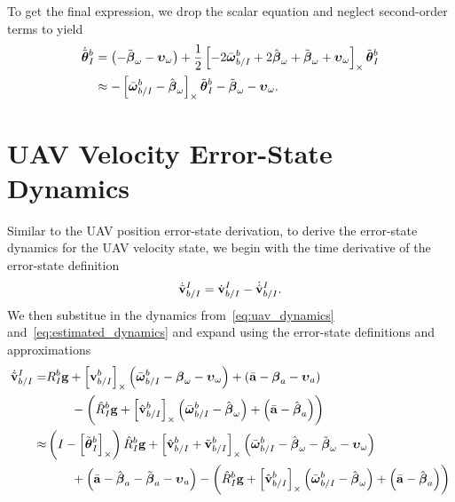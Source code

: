 To get the final expression, we drop the scalar equation and neglect
second-order terms to yield
\begin{align}
  \dot{\tilde{\boldsymbol{\mathrm{\theta}}}}_I^b
  &=
    \left( - \tilde{\boldsymbol{\mathrm{\beta}}}_\omega -
    \boldsymbol{\mathrm{\upsilon}}_\omega \right) 
    + \frac{1}{2}
    \left[  -2\bar{\boldsymbol{\mathrm{\omega}}}_{b/I}^b + 2\hat{\boldsymbol{\mathrm{\beta}}}_\omega
      + \tilde{\boldsymbol{\mathrm{\beta}}}_\omega + \boldsymbol{\mathrm{\upsilon}}_\omega  \right]_{\times}
    \tilde{\boldsymbol{\mathrm{\theta}}}_I^b \\
  &\approx
  -\left[  \bar{\boldsymbol{\mathrm{\omega}}}_{b/I}^b - \hat{\boldsymbol{\mathrm{\beta}}}_\omega \right]_{\times}
    \tilde{\boldsymbol{\mathrm{\theta}}}_I^b
    - \tilde{\boldsymbol{\mathrm{\beta}}}_\omega -
    \boldsymbol{\mathrm{\upsilon}}_\omega .
\end{align}

\section{UAV Velocity Error-State Dynamics}
Similar to the UAV position error-state derivation, to derive the error-state
dynamics for the UAV velocity state, we begin with the time derivative of the
error-state definition
\begin{equation}
  \dot{\tilde{\boldsymbol{\mathrm{v}}}}_{b/I}^I = \dot{\boldsymbol{\mathrm{v}}}_{b/I}^I -
  \dot{\hat{\boldsymbol{\mathrm{v}}}}_{b/I}^I.
\end{equation}
We then substitue in the dynamics from~\eqref{eq:uav_dynamics}
and~\eqref{eq:estimated_dynamics} and expand using the error-state definitions
and approximations
\begin{align}
  \dot{\tilde{\boldsymbol{\mathrm{v}}}}_{b/I}^I
  =&
  R_I^b \boldsymbol{\mathrm{g}}
  +
  \left[ \boldsymbol{\mathrm{v}}_{b/I}^b \right]_{\times}
  \left( \bar{\boldsymbol{\mathrm{\omega}}}_{b/I}^b - \boldsymbol{\mathrm{\beta}}_\omega -
  \boldsymbol{\mathrm{\upsilon}}_\omega \right)
  +
  \left( \bar{\boldsymbol{\mathrm{a}}} - \boldsymbol{\mathrm{\beta}}_a - \boldsymbol{\mathrm{\upsilon}}_a \right) \\
                                  & \qquad -
                                  \left( \hat{R}_I^b \boldsymbol{\mathrm{g}}
  +
  \left[ \hat{\boldsymbol{\mathrm{v}}}_{b/I}^b \right]_{\times}
  \left( \bar{\boldsymbol{\mathrm{\omega}}}_{b/I}^b - \hat{\boldsymbol{\mathrm{\beta}}}_\omega \right)
  +
\left( \bar{\boldsymbol{\mathrm{a}}} - \hat{\boldsymbol{\mathrm{\beta}}}_a \right) \right) \nonumber \\
  \approx&
  \left( I - \left[ \tilde{\boldsymbol{\mathrm{\theta}}}_I^b  \right]_{\times}\right) \hat{R}_I^b \boldsymbol{\mathrm{g}}
  +
  \left[  \hat{\boldsymbol{\mathrm{v}}}_{b/I}^b + \tilde{\boldsymbol{\mathrm{v}}}_{b/I}^b  \right]_{\times} 
  \left( \bar{\boldsymbol{\mathrm{\omega}}}_{b/I}^b - \hat{\boldsymbol{\mathrm{\beta}}}_\omega -
    \tilde{\boldsymbol{\mathrm{\beta}}}_\omega -
  \boldsymbol{\mathrm{\upsilon}}_\omega \right) \\
                                  & \qquad 
  + \left( \bar{\boldsymbol{\mathrm{a}}} - \hat{\boldsymbol{\mathrm{\beta}}}_a - \tilde{\boldsymbol{\mathrm{\beta}}}_a - \boldsymbol{\mathrm{\upsilon}}_a \right)
  - \left( \hat{R}_I^b \boldsymbol{\mathrm{g}}
  +
  \left[ \hat{\boldsymbol{\mathrm{v}}}_{b/I}^b \right]_{\times}
  \left( \bar{\boldsymbol{\mathrm{\omega}}}_{b/I}^b - \hat{\boldsymbol{\mathrm{\beta}}}_\omega \right)
  +
\left( \bar{\boldsymbol{\mathrm{a}}} - \hat{\boldsymbol{\mathrm{\beta}}}_a \right) \right) \nonumber
\end{align}
